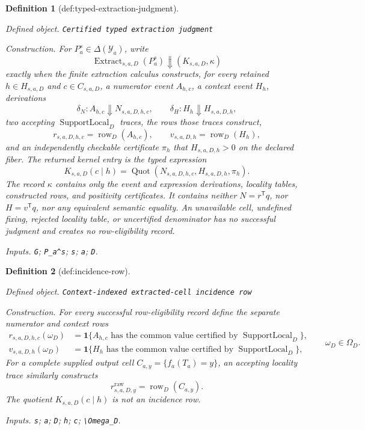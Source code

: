 \documentclass{article}
\newtheorem{definition}{Definition}
\begin{document}
\begin{definition}[def:typed-extraction-judgment]\label{def:typed-extraction-judgment}
\par\smallskip\noindent\emph{Defined object.} \texttt{Certified typed extraction judgment}
\par\smallskip\noindent\emph{Construction.} For \(P_a^s\in\Delta(\mathcal Y_a)\), write
\[
\operatorname{Extract}_{s,a,D}(P_a^s)
\Downarrow(K_{s,a,D},\kappa)
\]
exactly when the finite extraction calculus constructs, for every retained \(h\in H_{s,a,D}\) and \(c\in C_{s,a,D}\), a numerator event \(A_{h,c}\), a context event \(H_h\), derivations
\[
\delta_N:A_{h,c}\Downarrow N_{s,a,D,h,c},
\qquad
\delta_H:H_h\Downarrow H_{s,a,D,h},
\]
two accepting \(\operatorname{SupportLocal}_D\) traces, the rows those traces construct,
\[
r_{s,a,D,h,c}=\operatorname{row}_D(A_{h,c}),
\qquad
v_{s,a,D,h}=\operatorname{row}_D(H_h),
\]
and an independently checkable certificate \(\pi_h\) that \(H_{s,a,D,h}>0\) on the declared fiber.  The returned kernel entry is the typed expression
\[
K_{s,a,D}(c\mid h)=
\operatorname{Quot}(N_{s,a,D,h,c},H_{s,a,D,h},\pi_h).
\]
The record \(\kappa\) contains only the event and expression derivations, locality tables, constructed rows, and positivity certificates.  It contains neither \(N=r^{\mathsf T}q\), nor \(H=v^{\mathsf T}q\), nor any equivalent semantic equality.  An unavailable cell, undefined fixing, rejected locality table, or uncertified denominator has no successful judgment and creates no row-eligibility record.
\par\smallskip\noindent\emph{Inputs.} \texttt{G}; \texttt{P\_\allowbreak{}a\textasciicircum{}s}; \texttt{s}; \texttt{a}; \texttt{D}.
\end{definition}

\begin{definition}[def:incidence-row]\label{def:incidence-row}
\par\smallskip\noindent\emph{Defined object.} \texttt{Context-\allowbreak{}indexed extracted-\allowbreak{}cell incidence row}
\par\smallskip\noindent\emph{Construction.} For every successful row-eligibility record define the separate numerator and context rows
\[
\begin{split}
r_{s,a,D,h,c}(\omega_D)
&=\mathbf 1\{A_{h,c}\text{ has the common value certified by }
\operatorname{SupportLocal}_D\},\\
v_{s,a,D,h}(\omega_D)
&=\mathbf 1\{H_h\text{ has the common value certified by }
\operatorname{SupportLocal}_D\},
\end{split}
\qquad \omega_D\in\Omega_D.
\]
For a complete supplied output cell \(C_{a,y}=\{f_a(T_a)=y\}\), an accepting locality trace similarly constructs
\[
r^{\mathrm{raw}}_{s,a,D,y}=\operatorname{row}_D(C_{a,y}).
\]
The quotient \(K_{s,a,D}(c\mid h)\) is not an incidence row.
\par\smallskip\noindent\emph{Inputs.} \texttt{s}; \texttt{a}; \texttt{D}; \texttt{h}; \texttt{c}; \texttt{\textbackslash{}\allowbreak{}Omega\_\allowbreak{}D}.
\end{definition}
\end{document}
